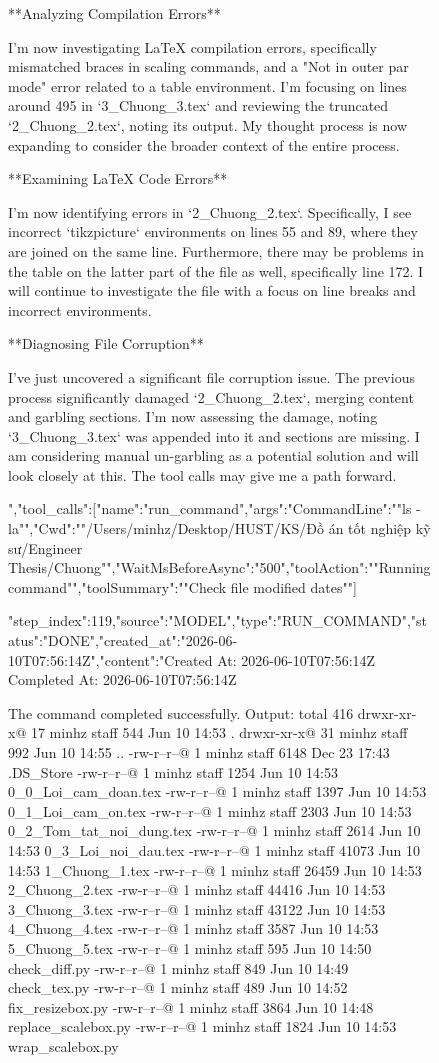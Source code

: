 \begin{figure}[htbp]
{**Analyzing Compilation Errors**

I'm now investigating LaTeX compilation errors, specifically mismatched braces in scaling commands, and a "Not in outer par mode" error related to a table environment. I'm focusing on lines around 495 in `3_Chuong_3.tex` and reviewing the truncated `2_Chuong_2.tex`, noting its output. My thought process is now expanding to consider the broader context of the entire process.


**Examining LaTeX Code Errors**

I'm now identifying errors in `2_Chuong_2.tex`. Specifically, I see incorrect `tikzpicture` environments on lines 55 and 89, where they are joined on the same line. Furthermore, there may be problems in the table on the latter part of the file as well, specifically line 172. I will continue to investigate the file with a focus on line breaks and incorrect environments.


**Diagnosing File Corruption**

I've just uncovered a significant file corruption issue. The previous process significantly damaged `2_Chuong_2.tex`, merging content and garbling sections. I'm now assessing the damage, noting `3_Chuong_3.tex` was appended into it and sections are missing. I am considering manual un-garbling as a potential solution and will look closely at this. The tool calls may give me a path forward.


","tool_calls":[{"name":"run_command","args":{"CommandLine":""ls -la"","Cwd":""/Users/minhz/Desktop/HUST/KS/Đồ án tốt nghiệp kỹ sư/Engineer Thesis/Chuong"","WaitMsBeforeAsync":"500","toolAction":""Running command"","toolSummary":""Check file modified dates""}}]}
{"step_index":119,"source":"MODEL","type":"RUN_COMMAND","status":"DONE","created_at":"2026-06-10T07:56:14Z","content":"Created At: 2026-06-10T07:56:14Z
Completed At: 2026-06-10T07:56:14Z

				The command completed successfully.
				Output:
				total 416
drwxr-xr-x@ 17 minhz  staff    544 Jun 10 14:53 .
drwxr-xr-x@ 31 minhz  staff    992 Jun 10 14:55 ..
-rw-r--r--@  1 minhz  staff   6148 Dec 23 17:43 .DS_Store
-rw-r--r--@  1 minhz  staff   1254 Jun 10 14:53 0_0_Loi_cam_doan.tex
-rw-r--r--@  1 minhz  staff   1397 Jun 10 14:53 0_1_Loi_cam_on.tex
-rw-r--r--@  1 minhz  staff   2303 Jun 10 14:53 0_2_Tom_tat_noi_dung.tex
-rw-r--r--@  1 minhz  staff   2614 Jun 10 14:53 0_3_Loi_noi_dau.tex
-rw-r--r--@  1 minhz  staff  41073 Jun 10 14:53 1_Chuong_1.tex
-rw-r--r--@  1 minhz  staff  26459 Jun 10 14:53 2_Chuong_2.tex
-rw-r--r--@  1 minhz  staff  44416 Jun 10 14:53 3_Chuong_3.tex
-rw-r--r--@  1 minhz  staff  43122 Jun 10 14:53 4_Chuong_4.tex
-rw-r--r--@  1 minhz  staff   3587 Jun 10 14:53 5_Chuong_5.tex
-rw-r--r--@  1 minhz  staff    595 Jun 10 14:50 check_diff.py
-rw-r--r--@  1 minhz  staff    849 Jun 10 14:49 check_tex.py
-rw-r--r--@  1 minhz  staff    489 Jun 10 14:52 fix_resizebox.py
-rw-r--r--@  1 minhz  staff   3864 Jun 10 14:48 replace_scalebox.py
-rw-r--r--@  1 minhz  staff   1824 Jun 10 14:53 wrap_scalebox.py

}
\end{figure}
